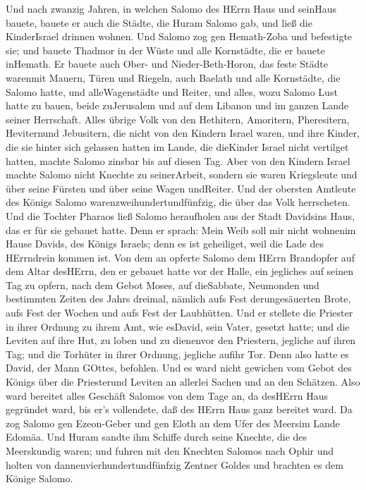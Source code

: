  Und nach zwanzig Jahren, in welchen Salomo des HErrn Haus
und seinHaus bauete,  bauete er auch die Städte, die Huram
Salomo gab, und ließ die KinderIsrael drinnen wohnen.  Und
Salomo zog gen Hemath-Zoba und befestigte sie;  und bauete
Thadmor in der Wüste und alle Kornstädte, die er bauete inHemath.
 Er bauete auch Ober- und Nieder-Beth-Horon, das feste
Städte warenmit Mauern, Türen und Riegeln,  auch Baelath und
alle Kornstädte, die Salomo hatte, und alleWagenstädte und Reiter, und
alles, wozu Salomo Lust hatte zu bauen, beide zuJerusalem und auf dem
Libanon und im ganzen Lande seiner Herrschaft.  Alles übrige
Volk von den Hethitern, Amoritern, Pheresitern, Heviternund Jebusitern,
die nicht von den Kindern Israel waren,  und ihre Kinder,
die sie hinter sich gelassen hatten im Lande, die dieKinder Israel nicht
vertilget hatten, machte Salomo zinsbar bis auf diesen Tag. 
Aber von den Kindern Israel machte Salomo nicht Knechte zu seinerArbeit,
sondern sie waren Kriegsleute und über seine Fürsten und über seine
Wagen undReiter.  Und der obersten Amtleute des Königs
Salomo warenzweihundertundfünfzig, die über das Volk herrscheten.
 Und die Tochter Pharaos ließ Salomo heraufholen aus der
Stadt Davidsins Haus, das er für sie gebauet hatte. Denn er sprach: Mein
Weib soll mir nicht wohnenim Hause Davids, des Königs Israels; denn es
ist geheiliget, weil die Lade des HErrndrein kommen ist. 
Von dem an opferte Salomo dem HErrn Brandopfer auf dem Altar desHErrn,
den er gebauet hatte vor der Halle,  ein jegliches auf
seinen Tag zu opfern, nach dem Gebot Moses, auf dieSabbate, Neumonden
und bestimmten Zeiten des Jahrs dreimal, nämlich aufs Fest
derungesäuerten Brote, aufs Fest der Wochen und aufs Fest der
Laubhütten.  Und er stellete die Priester in ihrer Ordnung
zu ihrem Amt, wie esDavid, sein Vater, gesetzt hatte; und die Leviten
auf ihre Hut, zu loben und zu dienenvor den Priestern, jegliche auf
ihren Tag; und die Torhüter in ihrer Ordnung, jegliche aufihr Tor. Denn
also hatte es David, der Mann GOttes, befohlen.  Und es
ward nicht gewichen vom Gebot des Königs über die Priesterund Leviten an
allerlei Sachen und an den Schätzen.  Also ward bereitet
alles Geschäft Salomos von dem Tage an, da desHErrn Haus gegründet ward,
bis er's vollendete, daß des HErrn Haus ganz bereitet ward.
 Da zog Salomo gen Ezeon-Geber und gen Eloth an dem Ufer
des Meersim Lande Edomäa.  Und Huram sandte ihm Schiffe
durch seine Knechte, die des Meerskundig waren; und fuhren mit den
Knechten Salomos nach Ophir und holten von dannenvierhundertundfünfzig
Zentner Goldes und brachten es dem Könige Salomo.

